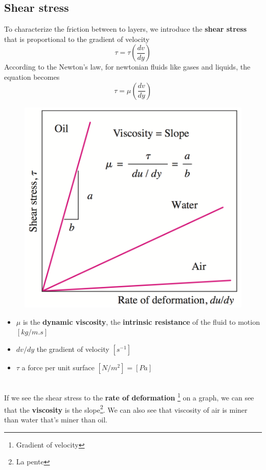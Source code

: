 \subsection{Shear stress}
	To characterize the friction between to layers, we introduce the \textbf{shear stress} that is proportional to the gradient of velocity
	\begin{equation}
		\tau = \tau \left( \frac{dv}{dy} \right)
	\end{equation}
	According to the Newton's law, for newtonian fluids like gases and liquids, the equation becomes
	\begin{equation}
		\tau = \mu \left( \frac{dv}{dy} \right)
	\end{equation}
	\begin{figure}
	\includegraphics[scale=0.26]{ch1/5}
	\end{figure}
	\begin{itemize}
		\item $\mu$ is the \textbf{dynamic viscosity}, the \textbf{intrinsic resistance} of the fluid to motion $[kg/m.s]$
		\item $dv/dy$ the gradient of velocity $[s^{-1}]$
		\item $\tau$ a force per unit surface $[N/m^2] = [Pa]$
	\end{itemize}
	\ \\
	If we see the shear stress to the \textbf{rate of deformation} \footnote{Gradient of velocity} on a graph, we can see that the \textbf{viscosity} is the slope\footnote{La pente}. We can also see that viscosity of air is miner than water that's miner than oil. 
	
